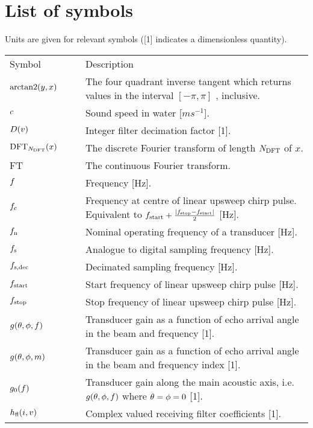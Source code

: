\documentclass[preprint,12pt,TurnOnLineNumbers]{JASAnew}
\begin{document}
\section{List of symbols}


Units are given for relevant symbols ([1] indicates a dimensionless quantity).

\begin{longtable}{p{0.25\linewidth} p{0.75\linewidth}}
Symbol & Description\\

$\textrm{arctan2}(y,x)$ & The four quadrant inverse tangent which returns values in the interval $[-\pi,\pi]$ , inclusive.\\
$c$ & Sound speed in water [$m s^{-1}$].\\
$D(v)$ & Integer filter decimation factor [1].\\
$\textrm{DFT}_{N_{\textrm{DFT}}}(x)$ & The discrete Fourier transform of length ${N_{\textrm{DFT}}}$ of $x$.\\
FT & The continuous Fourier transform. \\
$f$ & Frequency [Hz].\\
$f_{\textrm{c}}$ & Frequency at centre of linear upsweep chirp pulse. Equivalent to $f_{\textrm{start}} + \frac{|f_{\textrm{stop}} - f_{\textrm{start}}|}{2}$ [Hz].\\
$f_{\textrm{n}}$ & Nominal operating frequency of a transducer [Hz].\\
$f_{\textrm{s}}$ & Analogue to digital sampling frequency [Hz].\\
$f_{\textrm{s,dec}}$ & Decimated sampling frequency [Hz].\\
$f_{\textrm{start}}$ & Start frequency of linear upsweep chirp pulse [Hz].\\
$f_{\textrm{stop}}$ & Stop frequency of linear upsweep chirp pulse [Hz].\\

$g(\theta,\phi,f)$ & Transducer gain as a function of echo arrival angle in the beam and frequency [1].\\

$g(\theta,\phi,m)$ & Transducer gain as a function of echo arrival angle in the beam and frequency index [1].\\

$g_0(f)$ & Transducer gain along the main acoustic axis, i.e. $g(\theta, \phi,f)$ where $\theta = \phi = 0$ [1].\\

$h_{\textrm{fl}}(i,v)$ & Complex valued receiving filter coefficients [1].\\


\end{longtable}
\end{document}
